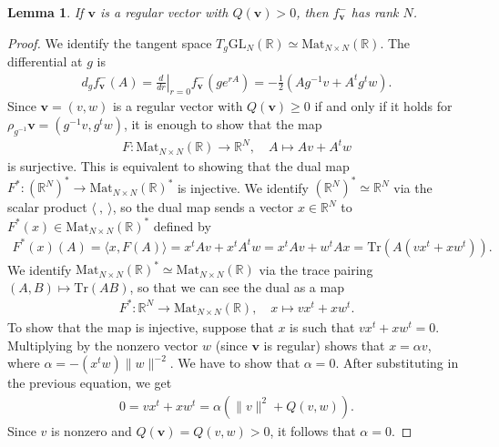 \documentclass[twoside,a4paper,10pt]{article} %
\newcommand{\8}{\infty}
\newcommand{\vbf}{\mathbf{v}}
\newcommand{\GL}{\mathrm{GL}}
\newcommand{\R}{\mathbb{R}}
\newcommand{\Tr}{\mathrm{Tr}}
\newcommand{\Mat}{\mathrm{Mat}}
\theoremstyle{mytheoremstyle}
\newtheorem{lem}[thm]{Lemma}
\theoremstyle{remark}
\numberwithin{equation}{section}
\begin{document}
\begin{lem} \label{rank lemma} If $\vbf$ is a regular vector with $Q(\vbf) > 0$, then $f^-_\vbf$ has rank $N$.
\end{lem}

\begin{proof} We identify the tangent space $T_g\GL_N(\R) \simeq \Mat_{N \times N}(\R)$. The differential at $g$ is
\begin{align}
d_g f_\vbf^- (A)= \left . \frac{d}{dr} \right \vert_{r=0} f_\vbf^- (ge^{rA})=-\frac{1}{2} \left ( Ag^{-1}v+A^tg^tw \right ).
\end{align}
Since $\vbf=(v,w)$ is a regular vector with $Q(\vbf) \geq 0$ if and only if it holds for $\rho_{g^{-1}} \vbf=(g^{-1}v,g^tw)$, it is enough to show that the map \begin{align}
F \colon \Mat_{N \times N}(\R) \longrightarrow \R^N, \quad A \longmapsto Av+A^tw
\end{align}is surjective. This is equivalent to showing that the dual map $ F^\ast \colon (\R^N)^\ast \longrightarrow \Mat_{N \times N}(\R)^\ast$ is injective. We identify $(\R^N)^\ast \simeq \R^N$ via the scalar product $\langle \ , \ \rangle$, so the dual map sends a vector $x \in \R^N$ to $F^\ast(x) \in \Mat_{N \times N}(\R)^\ast$ defined by 
\begin{align}
F^\ast(x)(A)= \langle x, F(A) \rangle=x^tAv+x^tA^tw=x^tAv+w^tAx=\Tr(A(vx^t+xw^t)).
\end{align}
We identify $ \Mat_{N \times N}(\R)^\ast \simeq \Mat_{N \times N}(\R) $ via the trace pairing $(A,B) \mapsto \Tr(AB)$, so that we can see the dual as a map
\begin{align}
F^\ast \colon \R^N \longrightarrow \Mat_{N \times N}(\R) , \quad x \longmapsto vx^t+xw^t.
\end{align}
To show that the map is injective, suppose that $x$ is such that $vx^t+xw^t=0$. Multiplying by the nonzero vector $w$ (since $\vbf$ is regular) shows that $x= \alpha v$, where $\alpha = -(x^tw) \lVert w \rVert^{-2}$. We have to show that $\alpha=0$. After substituting in the previous equation, we get
\begin{align}
0=vx^t+xw^t=\alpha (\lVert v \rVert^2+ Q(v,w)).
\end{align}
Since $v$ is nonzero and $Q(\vbf)=Q(v,w) > 0$, it follows that $\alpha=0$.
\end{proof}
\end{document}
